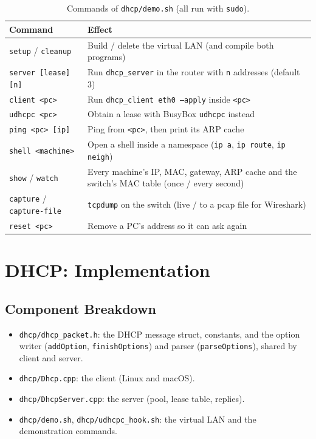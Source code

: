 \documentclass[11pt]{article}
\begin{document}
\begin{table}[H]
\centering
\small
\begin{tabular}{lp{10.2cm}}
\toprule
\textbf{Command} & \textbf{Effect} \\
\midrule
\texttt{setup} / \texttt{cleanup} & Build / delete the virtual LAN (and compile both programs) \\
\texttt{server [lease] [n]} & Run \texttt{dhcp\_server} in the router with \texttt{n}
  addresses (default 3) \\
\texttt{client <pc>} & Run \texttt{dhcp\_client eth0 --apply} inside \texttt{<pc>} \\
\texttt{udhcpc <pc>} & Obtain a lease with BusyBox \texttt{udhcpc} instead \\
\texttt{ping <pc> [ip]} & Ping from \texttt{<pc>}, then print its ARP cache \\
\texttt{shell <machine>} & Open a shell inside a namespace (\texttt{ip a},
  \texttt{ip route}, \texttt{ip neigh}) \\
\texttt{show} / \texttt{watch} & Every machine's IP, MAC, gateway, ARP cache and the
  switch's MAC table (once / every second) \\
\texttt{capture} / \texttt{capture-file} & \texttt{tcpdump} on the switch (live / to a
  pcap file for Wireshark) \\
\texttt{reset <pc>} & Remove a PC's address so it can ask again \\
\bottomrule
\end{tabular}
\caption{Commands of \texttt{dhcp/demo.sh} (all run with \texttt{sudo}).}
\label{tab:demo}
\end{table}

\section{DHCP: Implementation}

\subsection{Component Breakdown}
\begin{itemize}[leftmargin=1.6em]
  \item \texttt{dhcp/dhcp\_packet.h}: the DHCP message struct, constants, and the option
  writer (\texttt{addOption}, \texttt{finishOptions}) and parser (\texttt{parseOptions}),
  shared by client and server.
  \item \texttt{dhcp/Dhcp.cpp}: the client (Linux and macOS).
  \item \texttt{dhcp/DhcpServer.cpp}: the server (pool, lease table, replies).
  \item \texttt{dhcp/demo.sh}, \texttt{dhcp/udhcpc\_hook.sh}: the virtual LAN and the
  demonstration commands.
\end{itemize}
\end{document}
